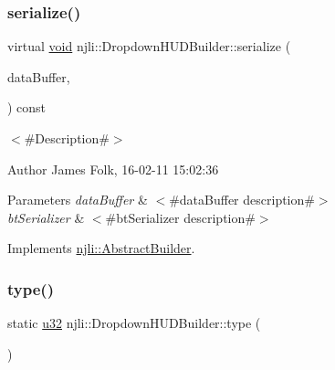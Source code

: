 \subsubsection{\texorpdfstring{serialize()}{serialize()}}
{\footnotesize\ttfamily virtual \mbox{\hyperlink{_thread_8h_af1e856da2e658414cb2456cb6f7ebc66}{void}} njli\+::\+Dropdown\+H\+U\+D\+Builder\+::serialize (\begin{DoxyParamCaption}\item[{\mbox{\hyperlink{_thread_8h_af1e856da2e658414cb2456cb6f7ebc66}{void}} $\ast$}]{data\+Buffer,  }\item[{bt\+Serializer $\ast$}]{ }\end{DoxyParamCaption}) const\hspace{0.3cm}{\ttfamily [virtual]}}



$<$\#\+Description\#$>$ 

\begin{DoxyAuthor}{Author}
James Folk, 16-\/02-\/11 15\+:02\+:36
\end{DoxyAuthor}

\begin{DoxyParams}{Parameters}
{\em data\+Buffer} & $<$\#data\+Buffer description\#$>$ \\
\hline
{\em bt\+Serializer} & $<$\#bt\+Serializer description\#$>$ \\
\hline
\end{DoxyParams}


Implements \mbox{\hyperlink{classnjli_1_1_abstract_builder_ab66b774e02ccb9da554c9aab7fa6d981}{njli\+::\+Abstract\+Builder}}.

\mbox{\label{classnjli_1_1_dropdown_h_u_d_builder_ab15297f8f1c7c1e73a4a7ff40f693b35}} 
\subsubsection{\texorpdfstring{type()}{type()}}
{\footnotesize\ttfamily static \mbox{\hyperlink{_util_8h_a10e94b422ef0c20dcdec20d31a1f5049}{u32}} njli\+::\+Dropdown\+H\+U\+D\+Builder\+::type (\begin{DoxyParamCaption}{ }\end{DoxyParamCaption})\hspace{0.3cm}{\ttfamily [static]}}

